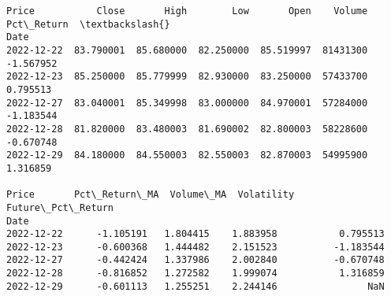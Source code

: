 \documentclass[11pt]{article}
\makeatletter
\newcommand{\boxspacing}{\kern\kvtcb@left@rule\kern\kvtcb@boxsep}
\newcommand{\prompt}[4]{
        {\ttfamily\llap{{\color{#2}[#3]:\hspace{3pt}#4}}\vspace{-\baselineskip}}
    }
\makeatother
\begin{document}
    \begin{Verbatim}[commandchars=\\\{\}]
Price           Close       High        Low       Open    Volume  Pct\_Return  \textbackslash{}
Date
2022-12-22  83.790001  85.680000  82.250000  85.519997  81431300   -1.567952
2022-12-23  85.250000  85.779999  82.930000  83.250000  57433700    0.795513
2022-12-27  83.040001  85.349998  83.000000  84.970001  57284000   -1.183544
2022-12-28  81.820000  83.480003  81.690002  82.800003  58228600   -0.670748
2022-12-29  84.180000  84.550003  82.550003  82.870003  54995900    1.316859

Price       Pct\_Return\_MA  Volume\_MA  Volatility  Future\_Pct\_Return
Date
2022-12-22      -1.105191   1.804415    1.883958           0.795513
2022-12-23      -0.600368   1.444482    2.151523          -1.183544
2022-12-27      -0.442424   1.337986    2.002840          -0.670748
2022-12-28      -0.816852   1.272582    1.999074           1.316859
2022-12-29      -0.601113   1.255251    2.244146                NaN
    \end{Verbatim}

    \begin{tcolorbox}[breakable, size=fbox, boxrule=1pt, pad at break*=1mm,colback=cellbackground, colframe=cellborder]
\prompt{In}{incolor}{ }{\boxspacing}
\begin{Verbatim}[commandchars=\\\{\}]

\end{Verbatim}
\end{tcolorbox}


    
    
    
\end{document}

